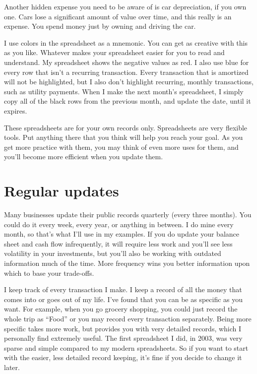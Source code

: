 Another hidden expense you need to be aware of is car depreciation, if you own one. Cars lose a significant amount of value over time, and this really is an expense. You spend money just by owning and driving the car.

I use colors in the spreadsheet as a mnemonic. You can get as creative with this as you like. Whatever makes your spreadsheet easier for you to read and understand. My spreadsheet shows the negative values as red. I also use blue for every row that isn't a recurring transaction. Every transaction that is amortized will not be highlighted, but I also don't highlight recurring, monthly transactions, such as utility payments. When I make the next month's spreadsheet, I simply copy all of the black rows from the previous month, and update the date, until it expires.

These spreadsheets are for your own records only. Spreadsheets are very flexible tools. Put anything there that you think will help you reach your goal. As you get more practice with them, you may think of even more uses for them, and you'll become more efficient when you update them.

\section{Regular updates}
Many businesses update their public records quarterly (every three months). You could do it every week, every year, or anything in between. I do mine every month, so that's what I'll use in my examples. If you do update your balance sheet and cash flow infrequently, it will require less work and you'll see less volatility in your investments, but you'll also be working with outdated information much of the time. More frequency wins you better information upon which to base your trade-offs.

I keep track of every transaction I make. I keep a record of all the money that comes into or goes out of my life. I've found that you can be as specific as you want. For example, when you go grocery shopping, you could just record the whole trip as ``Food'' or you may record every transaction separately. Being more specific takes more work, but provides you with very detailed records, which I personally find extremely useful. The first spreadsheet I did, in 2003, was very sparse and simple compared to my modern spreadsheets. So if you want to start with the easier, less detailed record keeping, it's fine if you decide to change it later.

